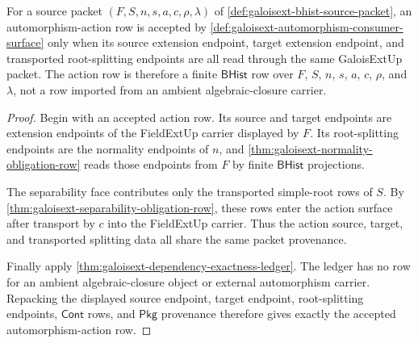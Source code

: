 \begin{theorem}
\label{thm:galoisext-automorphism-action-source}
For a source packet $(F,S,n,s,a,c,\rho,\lambda)$ of
\autoref{def:galoisext-bhist-source-packet}, an automorphism-action row is
accepted by
\autoref{def:galoisext-automorphism-consumer-surface} only when its source
extension endpoint, target extension endpoint, and transported root-splitting
endpoints are all read through the same GaloisExtUp packet. The action row is
therefore a finite $\mathsf{BHist}$ row over $F$, $S$, $n$, $s$, $a$, $c$,
$\rho$, and $\lambda$, not a row imported from an ambient algebraic-closure
carrier.
\end{theorem}
\begin{proof}
Begin with an accepted action row. Its source and target endpoints are
extension endpoints of the FieldExtUp carrier displayed by $F$. Its
root-splitting endpoints are the normality endpoints of $n$, and
\autoref{thm:galoisext-normality-obligation-row} reads those endpoints from
$F$ by finite $\mathsf{BHist}$ projections.

The separability face contributes only the transported simple-root rows of
$S$. By \autoref{thm:galoisext-separability-obligation-row}, these rows enter
the action surface after transport by $c$ into the FieldExtUp carrier. Thus
the action source, target, and transported splitting data all share the same
packet provenance.

Finally apply \autoref{thm:galoisext-dependency-exactness-ledger}. The ledger
has no row for an ambient algebraic-closure object or external automorphism
carrier. Repacking the displayed source endpoint, target endpoint,
root-splitting endpoints, $\mathsf{Cont}$ rows, and $\mathsf{Pkg}$ provenance
therefore gives exactly the accepted automorphism-action row.
\end{proof}

